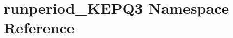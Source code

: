 \hypertarget{namespacerunperiod__KEPQ3}{\section{runperiod\-\_\-\-K\-E\-P\-Q3 Namespace Reference}
\label{namespacerunperiod__KEPQ3}
}
